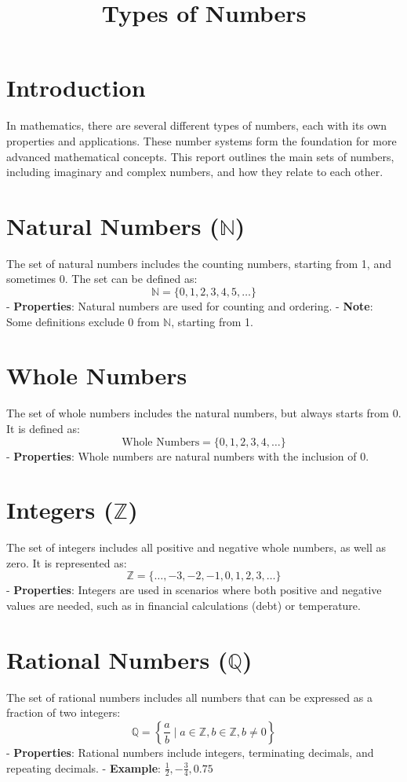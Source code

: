 \documentclass{article}
\begin{document}
\title{Types of Numbers}
\author{}
\date{}
\maketitle

\section{Introduction}
In mathematics, there are several different types of numbers, each with its own properties and applications. These number systems form the foundation for more advanced mathematical concepts. This report outlines the main sets of numbers, including imaginary and complex numbers, and how they relate to each other.

\section{Natural Numbers (\( \mathbb{N} \))}
The set of natural numbers includes the counting numbers, starting from 1, and sometimes 0. The set can be defined as:
\[
\mathbb{N} = \{0, 1, 2, 3, 4, 5, \dots\}
\]
- \textbf{Properties}: Natural numbers are used for counting and ordering.
- \textbf{Note}: Some definitions exclude 0 from \( \mathbb{N} \), starting from 1.

\section{Whole Numbers}
The set of whole numbers includes the natural numbers, but always starts from 0. It is defined as:
\[
\text{Whole Numbers} = \{0, 1, 2, 3, 4, \dots\}
\]
- \textbf{Properties}: Whole numbers are natural numbers with the inclusion of 0.

\section{Integers (\( \mathbb{Z} \))}
The set of integers includes all positive and negative whole numbers, as well as zero. It is represented as:
\[
\mathbb{Z} = \{\dots, -3, -2, -1, 0, 1, 2, 3, \dots\}
\]
- \textbf{Properties}: Integers are used in scenarios where both positive and negative values are needed, such as in financial calculations (debt) or temperature.

\section{Rational Numbers (\( \mathbb{Q} \))}
The set of rational numbers includes all numbers that can be expressed as a fraction of two integers:
\[
\mathbb{Q} = \left\{\frac{a}{b} \mid a \in \mathbb{Z}, b \in \mathbb{Z}, b \neq 0 \right\}
\]
- \textbf{Properties}: Rational numbers include integers, terminating decimals, and repeating decimals.
- \textbf{Example}: \( \frac{1}{2}, -\frac{3}{4}, 0.75 \)
\end{document}
